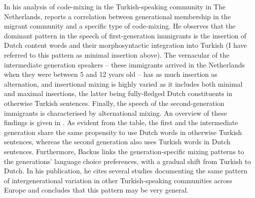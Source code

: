 In his analysis of code-mixing in the Turkish-speaking community in The Netherlands, \citet[][387--391]{backus-two-1996} reports a correlation between generational membership in the migrant community and a specific type of code-mixing. He observes that the dominant pattern in the speech of first-generation immigrants is the insertion of Dutch content words and their morphosyntactic integration into Turkish (I have referred to this pattern as minimal insertion above). The vernacular of the intermediate generation speakers -- these immigrants arrived in the Netherlands when they were between 5 and 12 years old -- has as much insertion as alternation, and insertional mixing is highly varied as it includes both minimal and maximal insertions, the latter being fully-fledged Dutch constituents in otherwise Turkish sentences. Finally, the speech of the second-generation immigrants is characterised by alternational mixing. An overview of these findings is given in . As evident from the table, the first and the intermediate generation share the same propensity to use Dutch words in otherwise Turkish sentences, whereas the second generation also uses Turkish words in Dutch sentences. Furthermore, Backus links the generation-specific mixing patterns to the generations' language choice preferences, with a gradual shift from Turkish to Dutch. In his \citeyear[][]{backus06} publication, he cites several studies documenting the same pattern of intergenerational variation in other Turkish-speaking communities across Europe and concludes that this pattern may be very general. 

\begin{table}
\caption{Distribution of main types of code-mixing, and base language in code-mixing across first, intermediate, and second generations in Turkish-Dutch code-mixing data \citep[adapted from][702]{backus06}.}
\label{tab:1:1}
\end{table}

